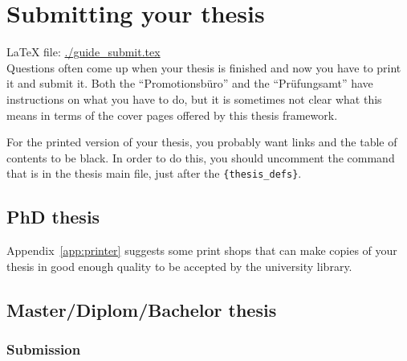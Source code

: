 \chapter{Submitting your thesis}
\label{sec:submit}

\LaTeX{} file: \url{./guide_submit.tex}\\[1ex]
\noindent
Questions often come up when your thesis is finished and now you have
to print it and submit it. Both the
\foreignquote{ngerman}{Promotionsbüro} and the
\foreignquote{ngerman}{Prüfungsamt} have instructions on what you have
to do, but it is sometimes not clear what this means in terms of the
cover pages offered by this thesis framework.

For the printed version of your thesis, you probably want
 links and the table of contents to be black. In
order to do this, you should uncomment the  command
that is in the thesis main file, just after the
\texttt{\{thesis\_defs\}}.


\section{PhD thesis}
\label{sec:submit:phd}



Appendix~\ref{app:printer} suggests some print shops that can make copies
of your thesis in good enough quality to be accepted by the university
library.


\section{Master/Diplom/Bachelor thesis}
\label{sec:submit:other}

\subsection{Submission}

